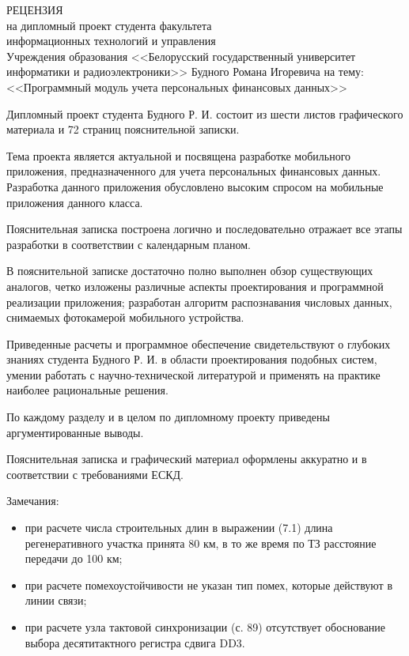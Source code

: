 \documentclass[a4paper,hidelinks,14pt]{extarticle}
\begin{document}
\thispagestyle{empty}

\begin{center}
РЕЦЕНЗИЯ \\
на дипломный проект студента факультета \\
информационных технологий и управления \\
Учреждения образования <<Белорусский государственный университет \\
информатики и радиоэлектроники>> Будного Романа Игоревича на тему: \\
<<Программный модуль учета персональных финансовых данных>>
\end{center}

Дипломный проект студента Будного Р. И. состоит из шести листов
графического материала и 72 страниц пояснительной записки.

Тема проекта является актуальной и посвящена разработке мобильного приложения,
предназначенного для учета персональных финансовых данных.
Разработка данного приложения обусловлено высоким спросом на мобильные
приложения данного класса.

Пояснительная записка построена логично и последовательно отражает все этапы
разработки в соответствии с календарным планом.

В пояснительной записке достаточно полно выполнен обзор существующих аналогов,
четко изложены различные аспекты проектирования и программной реализации
приложения; разработан алгоритм распознавания числовых данных,
снимаемых фотокамерой мобильного устройства.

Приведенные расчеты и программное обеспечение свидетельствуют о глубоких
знаниях студента Будного Р. И. в области проектирования подобных систем,
умении работать с научно-технической литературой и применять на практике
наиболее рациональные решения.

По каждому разделу и в целом по дипломному проекту приведены
аргументированные выводы.

Пояснительная записка и графический материал оформлены аккуратно и в
соответствии с требованиями ЕСКД.

{\color{red}
  Замечания:
  \begin{itemize}
  \item при расчете числа строительных длин в выражении (7.1) длина регенеративного
    участка принята 80 км, в то же время по ТЗ расстояние передачи до 100 км;
  \item при расчете помехоустойчивости не указан тип помех, которые действуют в линии связи;
  \item при расчете узла тактовой синхронизации (с. 89) отсутствует обоснование выбора
    десятитактного регистра сдвига DD3.
  \end{itemize}
}
\end{document}
